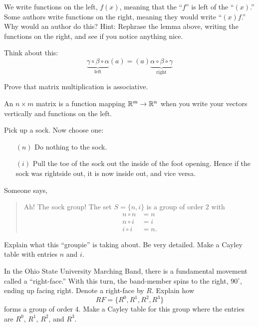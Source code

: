 \documentclass{ximera}
\begin{document}
\begin{exercise}
  We write functions on the left, $f(x)$, meaning that the ``$f$'' is
  left of the ``$(x)$.''  Some authors write functions on the right,
  meaning they would write ``$(x)f$.'' Why would an author do this? Hint:
  Rephrase the lemma above, writing the functions on the right, and
  see if you notice anything nice.
  \begin{hint}
    Think about this:
    \[
    \underbrace{\gamma\circ\beta\circ\alpha}_{\text{left}}(a) = (a)\underbrace{\alpha\circ\beta\circ\gamma}_{\text{right}}
    \]
  \end{hint}
\end{exercise}



\begin{exercise}
  Prove that matrix multiplication is associative.
  \begin{hint}
    An $n\times m$ matrix is a function mapping $\mathbb R^m\to \mathbb R^n$ when
    you write your vectors vertically and functions on the left.
  \end{hint}
\end{exercise}




\begin{exercise}\label{E:SG}
  Pick up a sock. Now choose one:
  \begin{enumerate}
  \item[$(n)$] Do nothing to the sock.
  \item[$(i)$] Pull the toe of the sock out the inside of the foot
    opening. Hence if the sock was rightside out, it is now inside
    out, and vice versa.
  \end{enumerate}
  Someone says,
  \begin{quote}
    Ah! The sock group! The set $S =\{n,i\}$ is a group of order $2$ with
    \begin{align*}
      n\circ n &= n\\
  n\circ i &= i\\
  i\circ i &= n.
  \end{align*}
  \end{quote}
  Explain what this ``groupie'' is taking about. Be very
  detailed. Make a Cayley table with entries $n$ and $i$. 
\end{exercise}

\begin{exercise}\label{E:rf}
  In the Ohio State University Marching Band, there is a fundamental
  movement called a ``right-face.'' With this turn, the band-member
  spins to the right, $90^\circ$, ending up facing right. Denote a
  right-face by $R$. Explain how
  \[
  RF=\{R^0,R^1,R^2,R^3\}
  \]
  forms a group of order $4$. Make a Cayley table for this group where the entries
  are $R^0$, $R^1$, $R^2$, and $R^3$.
\end{exercise}
\end{document}
